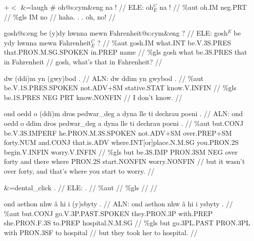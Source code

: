 \documentclass[a4paper,10pt]{article}
\begin{document}
\ex
\begingl[lingstyle=gergl]
\glchat +$<$ \&=laugh \# oh@s:cym\&eng na ! //
\glsurface ELE:  oh$^{C}_{E}$ na !  //
\glauto \%aut  oh{\scriptsize .IM} neg{\scriptsize .PRT}   //
\glmanual \%gls  IM no   //
\gleng haha. . . oh, no! //
\endgl
\xe

\ex
\begingl[lingstyle=gergl]
\glchat gosh@s:eng be (y)dy hwnna mewn Fahrenheit@s:cym\&eng ? //
\glsurface ELE:  gosh$^{E}$ be ydy hwnna mewn Fahrenheit$^{C}_{E}$ ?  //
\glauto \%aut  gosh{\scriptsize .IM} what{\scriptsize .INT} be{\scriptsize .V.3S.PRES} that{\scriptsize .PRON.M.SG.SPOKEN} in{\scriptsize .PREP} name   //
\glmanual \%gls  gosh what be{\scriptsize .3S.PRES} that in Fahrenheit   //
\gleng gosh, what's that in Fahrenheit? //
\endgl
\xe

\ex
\begingl[lingstyle=gergl]
\glchat dw (ddi)m yn (gwy)bod . //
\glsurface ALN:  dw ddim yn gwybod .  //
\glauto \%aut  be{\scriptsize .V.1S.PRES.SPOKEN} not{\scriptsize .ADV+SM} stative{\scriptsize .STAT} know{\scriptsize .V.INFIN}   //
\glmanual \%gls  be{\scriptsize .1S.PRES} NEG PRT know{\scriptsize .NONFIN}   //
\gleng I don't know. //
\endgl
\xe

\ex
\begingl[lingstyle=gergl]
\glchat ond oedd o (ddi)m dros pedwar\_deg a dyna lle ti dechrau poeni . //
\glsurface ALN:  ond oedd o ddim dros pedwar\_deg a dyna lle ti dechrau poeni .  //
\glauto \%aut  but{\scriptsize .CONJ} be{\scriptsize .V.3S.IMPERF} he{\scriptsize .PRON.M.3S.SPOKEN} not{\scriptsize .ADV+SM} over{\scriptsize .PREP+SM} forty{\scriptsize .NUM} and{\scriptsize .CONJ} that{\scriptsize .is.ADV} where{\scriptsize .INT[or]place.N.M.SG} you{\scriptsize .PRON.2S} begin{\scriptsize .V.INFIN} worry{\scriptsize .V.INFIN}   //
\glmanual \%gls  but be{\scriptsize .3S.IMP} PRON{\scriptsize .3SM} NEG over forty and there where PRON{\scriptsize .2S} start{\scriptsize .NONFIN} worry{\scriptsize .NONFIN}   //
\gleng but it wasn't over forty, and that's where you start to worry. //
\endgl
\xe

\ex
\begingl[lingstyle=gergl]
\glchat \&=dental\_click . //
\glsurface ELE:  .  //
\glauto \%aut    //
\glmanual \%gls    //
\gleng  //
\endgl
\xe

\ex
\begingl[lingstyle=gergl]
\glchat ond aethon nhw â hi i (y)sbyty . //
\glsurface ALN:  ond aethon nhw â hi i ysbyty .  //
\glauto \%aut  but{\scriptsize .CONJ} go{\scriptsize .V.3P.PAST.SPOKEN} they{\scriptsize .PRON.3P} with{\scriptsize .PREP} she{\scriptsize .PRON.F.3S} to{\scriptsize .PREP} hospital{\scriptsize .N.M.SG}   //
\glmanual \%gls  but go{\scriptsize .3PL.PAST} PRON{\scriptsize .3PL} with PRON{\scriptsize .3SF} to hospital   //
\gleng but they took her to hospital. //
\endgl
\xe
\end{document}
